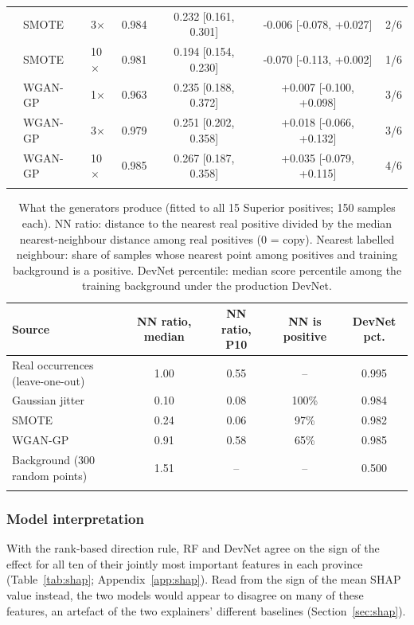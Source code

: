 \documentclass[pdflatex,sn-apa]{sn-jnl}
\begin{document}
\begin{table}[t]
\begin{tabular*}{\textwidth}{@{\extracolsep\fill}lllcccc}
 & SMOTE & 3$\times$ & 0.984 & 0.232 [0.161, 0.301] & -0.006 [-0.078, +0.027] & 2/6 \\
 & SMOTE & 10$\times$ & 0.981 & 0.194 [0.154, 0.230] & -0.070 [-0.113, +0.002] & 1/6 \\
 & WGAN-GP & 1$\times$ & 0.963 & 0.235 [0.188, 0.372] & +0.007 [-0.100, +0.098] & 3/6 \\
 & WGAN-GP & 3$\times$ & 0.979 & 0.251 [0.202, 0.358] & +0.018 [-0.066, +0.132] & 3/6 \\
 & WGAN-GP & 10$\times$ & 0.985 & 0.267 [0.187, 0.358] & +0.035 [-0.079, +0.115] & 4/6 \\
\botrule
\end{tabular*}
\end{table}

\begin{table}[t]
\caption{What the generators produce (fitted to all 15 Superior positives; 150 samples each). NN ratio: distance to the nearest real positive divided by the median nearest-neighbour distance among real positives (0 = copy). Nearest labelled neighbour: share of samples whose nearest point among positives and training background is a positive. DevNet percentile: median score percentile among the training background under the production DevNet.}\label{tab:aug-diag}
\footnotesize
\setlength{\tabcolsep}{2.5pt}
\begin{tabular*}{\textwidth}{@{\extracolsep\fill}lcccc}
\toprule
Source & NN ratio, median & NN ratio, P10 & NN is positive & DevNet pct. \\
\midrule
Real occurrences (leave-one-out) & 1.00 & 0.55 & -- & 0.995 \\
Gaussian jitter & 0.10 & 0.08 & 100\% & 0.984 \\
SMOTE & 0.24 & 0.06 & 97\% & 0.982 \\
WGAN-GP & 0.91 & 0.58 & 65\% & 0.985 \\
Background (300 random points) & 1.51 & -- & -- & 0.500 \\
\botrule
\end{tabular*}
\end{table}

\subsubsection{Model interpretation}\label{sec:res-shap}

With the rank-based direction rule, RF and DevNet agree on the sign of the effect for all ten of their jointly most important features in each province (Table~\ref{tab:shap}; Appendix~\ref{app:shap}). Read from the sign of the mean SHAP value instead, the two models would appear to disagree on many of these features, an artefact of the two explainers' different baselines (Section~\ref{sec:shap}).
\end{document}
